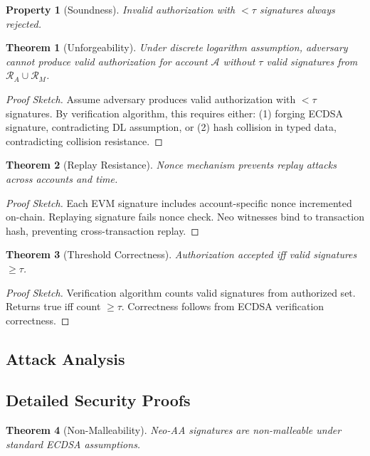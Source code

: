 \documentclass[10pt,twocolumn]{article}
\newtheorem{theorem}{Theorem}
\newtheorem{property}{Property}
\begin{document}
\begin{property}[Soundness]
Invalid authorization with $< \tau$ signatures always rejected.
\end{property}


\begin{theorem}[Unforgeability]
Under discrete logarithm assumption, adversary cannot produce valid authorization for account $\mathcal{A}$ without $\tau$ valid signatures from $\mathcal{R}_A \cup \mathcal{R}_M$.
\end{theorem}

\begin{proof}[Proof Sketch]
Assume adversary produces valid authorization with $< \tau$ signatures. By verification algorithm, this requires either: (1) forging ECDSA signature, contradicting DL assumption, or (2) hash collision in typed data, contradicting collision resistance.
\end{proof}

\begin{theorem}[Replay Resistance]
Nonce mechanism prevents replay attacks across accounts and time.
\end{theorem}


\begin{proof}[Proof Sketch]
Each EVM signature includes account-specific nonce incremented on-chain. Replaying signature fails nonce check. Neo witnesses bind to transaction hash, preventing cross-transaction replay.
\end{proof}

\begin{theorem}[Threshold Correctness]
Authorization accepted iff valid signatures $\geq \tau$.
\end{theorem}

\begin{proof}[Proof Sketch]
Verification algorithm counts valid signatures from authorized set. Returns true iff count $\geq \tau$. Correctness follows from ECDSA verification correctness.
\end{proof}

\subsection{Attack Analysis}

\subsection{Detailed Security Proofs}

\begin{theorem}[Non-Malleability]
Neo-AA signatures are non-malleable under standard ECDSA assumptions.
\end{theorem}
\end{document}

